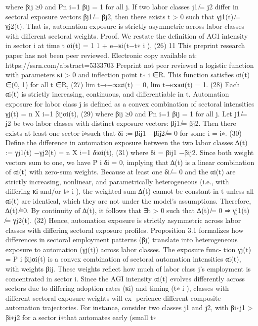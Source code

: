 where βij ≥0 and Pn
i=1 βij = 1 for all j. If two labor classes j1 ̸= j2 differ in sectoral exposure
vectors βj1 ̸= βj2, then there exists t > 0 such that γj1(t) ̸= γj2(t). That is, automation
exposure is strictly asymmetric across labor classes with different sectoral weights.
Proof. We restate the definition of AGI intensity in sector i at time t
αi(t) =
1
1 + e−κi(t−t∗
i ),
(26)
11
This preprint research paper has not been peer reviewed. Electronic copy available at: https://ssrn.com/abstract=5333703
Preprint not peer reviewed
a logistic function with parameters κi > 0 and inflection point t∗
i ∈R. This function satisfies
αi(t) ∈(0, 1)
for all t ∈R,
(27)
lim
t→−∞αi(t) = 0,
lim
t→∞αi(t) = 1.
(28)
Each αi(t) is strictly increasing, continuous, and differentiable in t. Automation exposure
for labor class j is defined as a convex combination of sectoral intensities
γj(t) =
n
X
i=1
βijαi(t),
(29)
where βij ≥0 and Pn
i=1 βij = 1 for all j. Let j1 ̸= j2 be two labor classes with distinct
exposure vectors: βj1 ̸= βj2. Then there exists at least one sector i∗such that
δi := βij1 −βij2 ̸= 0
for some i = i∗.
(30)
Define the difference in automation exposure between the two labor classes
∆(t) := γj1(t) −γj2(t) =
n
X
i=1
δiαi(t),
(31)
where δi = βij1 −βij2. Since both weight vectors sum to one, we have P
i δi = 0, implying
that ∆(t) is a linear combination of αi(t) with zero-sum weights. Because at least one δi ̸= 0
and the αi(t) are strictly increasing, nonlinear, and parametrically heterogeneous (i.e., with
differing κi and/or t∗
i ), the weighted sum ∆(t) cannot be constant in t unless all αi(t) are
identical, which they are not under the model’s assumptions. Therefore, ∆(t) ̸≡0. By
continuity of ∆(t), it follows that
∃t > 0 such that ∆(t) ̸= 0
⇒
γj1(t) ̸= γj2(t).
(32)
Hence, automation exposure is strictly asymmetric across labor classes with differing sectoral
exposure profiles.
Proposition 3.1 formalizes how differences in sectoral employment patterns (βj) translate
into heterogeneous exposure to automation (γj(t)) across labor classes. The exposure func-
tion γj(t) = P
i βijαi(t) is a convex combination of sectoral automation intensities αi(t), with
weights βij. These weights reflect how much of labor class j’s employment is concentrated
in sector i. Since the AGI intensity αi(t) evolves differently across sectors due to differing
adoption rates (κi) and timing (t∗
i ), classes with different sectoral exposure weights will ex-
perience different composite automation trajectories. For instance, consider two classes j1
and j2, with βi∗j1 > βi∗j2 for a sector i∗that automates early (small t∗
